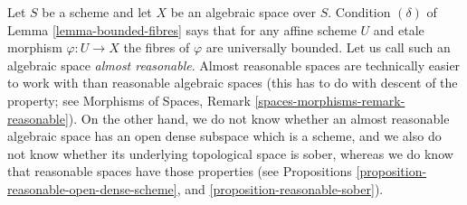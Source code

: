 \begin{remark}
\label{remark-almost-reasonable}
Let $S$ be a scheme and let $X$ be an algebraic space over $S$.
Condition $(\delta)$ of Lemma \ref{lemma-bounded-fibres} says that for any
affine scheme $U$ and etale morphism $\varphi : U \to X$ the fibres
of $\varphi$ are universally bounded. Let us call such an algebraic
space {\it almost reasonable}. Almost reasonable spaces are
technically easier to work with than reasonable algebraic spaces
(this has to do with descent of the property; see
Morphisms of Spaces, Remark \ref{spaces-morphisms-remark-reasonable}).
On the other hand, we do not know whether an almost reasonable algebraic
space has an open dense subspace which is a scheme, and we also do not know
whether its underlying topological space is sober, whereas we do know that
reasonable spaces have those properties (see
Propositions \ref{proposition-reasonable-open-dense-scheme}, and
\ref{proposition-reasonable-sober}).
\end{remark}

